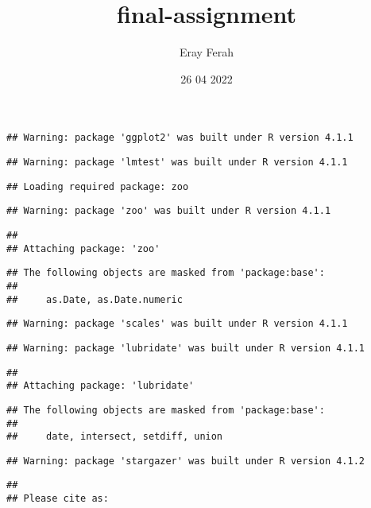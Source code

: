 \documentclass[
]{article}
\title{final-assignment}
\author{Eray Ferah}
\date{26 04 2022}
\begin{document}
\maketitle

\begin{verbatim}
## Warning: package 'ggplot2' was built under R version 4.1.1
\end{verbatim}

\begin{verbatim}
## Warning: package 'lmtest' was built under R version 4.1.1
\end{verbatim}

\begin{verbatim}
## Loading required package: zoo
\end{verbatim}

\begin{verbatim}
## Warning: package 'zoo' was built under R version 4.1.1
\end{verbatim}

\begin{verbatim}
## 
## Attaching package: 'zoo'
\end{verbatim}

\begin{verbatim}
## The following objects are masked from 'package:base':
## 
##     as.Date, as.Date.numeric
\end{verbatim}

\begin{verbatim}
## Warning: package 'scales' was built under R version 4.1.1
\end{verbatim}

\begin{verbatim}
## Warning: package 'lubridate' was built under R version 4.1.1
\end{verbatim}

\begin{verbatim}
## 
## Attaching package: 'lubridate'
\end{verbatim}

\begin{verbatim}
## The following objects are masked from 'package:base':
## 
##     date, intersect, setdiff, union
\end{verbatim}

\begin{verbatim}
## Warning: package 'stargazer' was built under R version 4.1.2
\end{verbatim}

\begin{verbatim}
## 
## Please cite as:
\end{verbatim}
\end{document}
